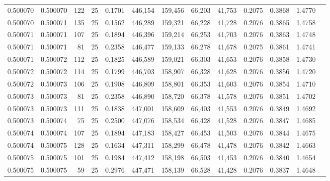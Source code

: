 \begin{tabular}{rrrrrrrrrrrrr}
0.500070 & 0.500070 & 122 &  25 &                                     0.1701 & 446,154 & 159,456 &  66,203 &  41,753 & 0.2075 & 0.3868 & 1.4770 \\
0.500070 & 0.500071 & 135 &  25 &                                     0.1562 & 446,289 & 159,321 &  66,228 &  41,728 & 0.2076 & 0.3865 & 1.4758 \\
0.500071 & 0.500071 & 107 &  25 &                                     0.1894 & 446,396 & 159,214 &  66,253 &  41,703 & 0.2076 & 0.3863 & 1.4748 \\
0.500071 & 0.500071 &  81 &  25 &                                     0.2358 & 446,477 & 159,133 &  66,278 &  41,678 & 0.2075 & 0.3861 & 1.4741 \\
0.500071 & 0.500072 & 112 &  25 &                                     0.1825 & 446,589 & 159,021 &  66,303 &  41,653 & 0.2076 & 0.3858 & 1.4730 \\
0.500072 & 0.500072 & 114 &  25 &                                     0.1799 & 446,703 & 158,907 &  66,328 &  41,628 & 0.2076 & 0.3856 & 1.4720 \\
0.500072 & 0.500073 & 106 &  25 &                                     0.1908 & 446,809 & 158,801 &  66,353 &  41,603 & 0.2076 & 0.3854 & 1.4710 \\
0.500073 & 0.500073 &  81 &  25 &                                     0.2358 & 446,890 & 158,720 &  66,378 &  41,578 & 0.2076 & 0.3851 & 1.4702 \\
0.500073 & 0.500073 & 111 &  25 &                                     0.1838 & 447,001 & 158,609 &  66,403 &  41,553 & 0.2076 & 0.3849 & 1.4692 \\
0.500073 & 0.500074 &  75 &  25 &                                     0.2500 & 447,076 & 158,534 &  66,428 &  41,528 & 0.2076 & 0.3847 & 1.4685 \\
0.500074 & 0.500074 & 107 &  25 &                                     0.1894 & 447,183 & 158,427 &  66,453 &  41,503 & 0.2076 & 0.3844 & 1.4675 \\
0.500074 & 0.500075 & 128 &  25 &                                     0.1634 & 447,311 & 158,299 &  66,478 &  41,478 & 0.2076 & 0.3842 & 1.4663 \\
0.500075 & 0.500075 & 101 &  25 &                                     0.1984 & 447,412 & 158,198 &  66,503 &  41,453 & 0.2076 & 0.3840 & 1.4654 \\
0.500075 & 0.500075 &  59 &  25 &                                     0.2976 & 447,471 & 158,139 &  66,528 &  41,428 & 0.2076 & 0.3837 & 1.4648 \\

\end{tabular}
